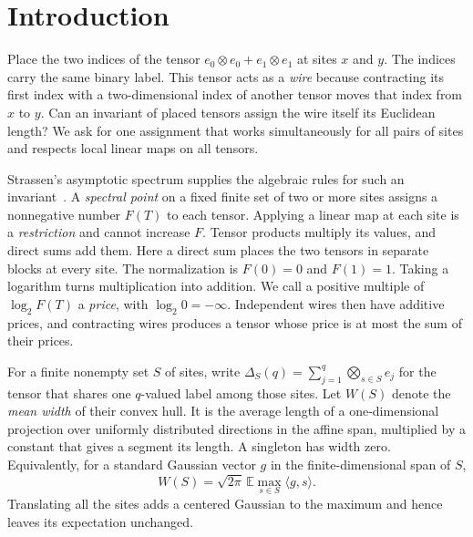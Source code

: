 \section{Introduction}

Place the two indices of the tensor
\(e_0\otimes e_0+e_1\otimes e_1\) at sites \(x\) and \(y\).
The indices carry the same binary label. This tensor acts as a
\emph{wire} because contracting its first index with a two-dimensional index of
another tensor moves that index from \(x\) to \(y\). Can an invariant
of placed tensors assign the wire itself its Euclidean length? We ask
for one assignment that works simultaneously for all pairs of sites
and respects local linear maps on all tensors.

Strassen's asymptotic spectrum supplies the algebraic rules for such an
invariant~\cite{Strassen1988}. A \emph{spectral point} on a fixed finite
set of two or more sites assigns a nonnegative number \(F(T)\) to each tensor.
Applying a linear map at each site is a \emph{restriction} and cannot
increase \(F\). Tensor products multiply its values, and direct sums
add them. Here a direct sum places the two tensors in separate blocks at
every site. The normalization is \(F(0)=0\) and \(F(1)=1\).
Taking a logarithm turns multiplication into addition. We call a
positive multiple of \(\log_2 F(T)\) a \emph{price}, with
\(\log_2 0=-\infty\). Independent wires
then have additive prices, and contracting wires produces a tensor whose price is at most the sum of
their prices.

For a finite nonempty set \(S\) of sites, write
\(\Delta_S(q)=\sum_{j=1}^q\bigotimes_{s\in S}e_j\) for the tensor
that shares one \(q\)-valued label among those sites. Let \(W(S)\)
denote the \emph{mean width} of their convex hull. It is the average
length of a one-dimensional projection over uniformly distributed
directions in the affine span, multiplied by a constant that gives
a segment its length. A singleton has width zero. Equivalently, for a standard Gaussian vector \(g\)
in the finite-dimensional span of \(S\),
\[
                   W(S)=\sqrt{2\pi}\,\mathbb E\max_{s\in S}\langle g,s\rangle .
\]
Translating all the sites adds a centered Gaussian to the maximum and
hence leaves its expectation unchanged.

